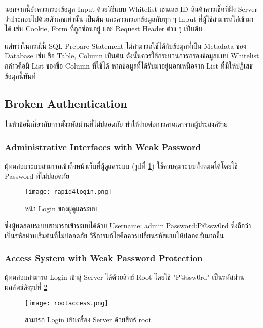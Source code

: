 นอกจากนี้ยังควรกรองข้อมูล Input ด้วยวิธีแบบ Whitelist เช่นเลข ID สินค้าควรเช็คที่ฝั่ง Server ว่าประกอบไปด้วยตัวเลขเท่านั้น เป็นต้น และควรกรอกข้อมูลกับทุก ๆ Input ที่ผู้ใช้สามารถใส่เข้ามาได้ เช่น Cookie, Form ที่ถูกซ่อนอยู่ และ Request Header ต่าง ๆ เป็นต้น

แต่ทว่าในกรณีนี้ SQL Prepare Statement ไม่สามารถใช้ได้กับข้อมูลที่เป็น Metadata ของ Database เช่น ชื่อ Table, Column เป็นต้น ดังนั้นควรใช้กระบวนการกรองข้อมูลแบบ Whitelist กล่าวคือมี List ของชื่อ Column ที่ใช้ได้ หากข้อมูลที่ได้รับมาอยู่นอกเหนือจาก List ที่มีให้ปฏิเสธข้อมูลนี้ทันที

\subsection{Broken Authentication}

ในหัวข้อนี้เกี่ยวกับการตั้งรหัสผ่านที่ไม่ปลอดภัย ทำให้ง่ายต่อการคาดเดาจากผู้ประสงค์ร้าย

\subsubsection{Administrative Interfaces with Weak Password}

ผู้ทดสอบระบบสามารถเข้าถึงหน้าเว็บที่ผู้ดูแลระบบ (รูปที่  \ref{Fig:rapid4login.png}) ใช้ควบคุมระบบทั้งหมดได้โดยใช้ Password ที่ไม่ปลอดภัย

 \begin{figure}[h]
	\centering
	\texttt{[image: rapid4login.png]}
	\caption{หน้า Login ของผู้ดูแลระบบ}
	\label{Fig:rapid4login.png}
\end{figure}

ซึ่งผู้ทดสอบระบบสามารถเข้าระบบได้ด้วย Username: admin Password:P@ssw0rd ซึ่งถือว่าเป็นรหัสผ่านเริ่มต้นที่ไม่ปลอดภัย วิธีการแก้ไขคือควรเปลี่ยนรหัสผ่านให้ปลอดภัยมากขึ้น

\subsubsection{Access System with Weak Password Protection}

ผู้ทดสอบสามารถ Login เข้าสู้ Server ได้ด้วยสิทธ์ Root โดยใช้ "P@ssw0rd" เป็นรหัสผ่าน ผลลัพธ์ดังรูปที่ \ref{Fig:rootaccess.png}

 \begin{figure}[h]
	\centering
	\texttt{[image: rootaccess.png]}
	\caption{สามารถ Login เข้าเครื่อง Server ด้วยสิทธ์ root}
	\label{Fig:rootaccess.png}
\end{figure}


